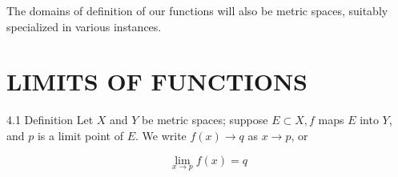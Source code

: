\documentclass[10pt]{article}
\begin{document}
The domains of definition of our functions will also be metric spaces, suitably specialized in various instances.

\section{LIMITS OF FUNCTIONS}
4.1 Definition Let $X$ and $Y$ be metric spaces; suppose $E \subset X, f$ maps $E$ into $Y$, and $p$ is a limit point of $E$. We write $f(x) \rightarrow q$ as $x \rightarrow p$, or

$$
\lim _{x \rightarrow p} f(x)=q
$$
\end{document}
